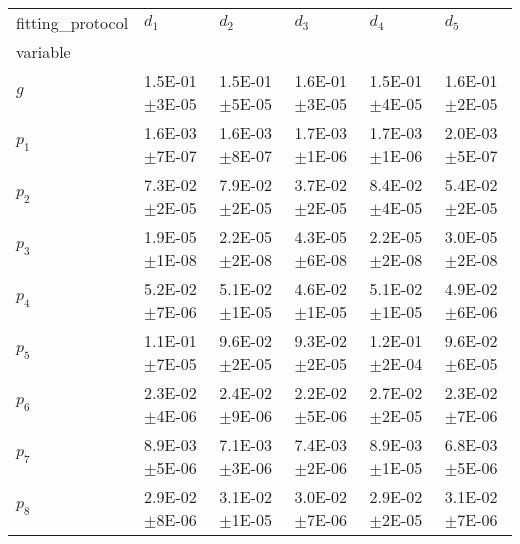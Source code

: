 \begin{tabular}{llllll}
fitting_protocol & $d_1$ & $d_2$ & $d_3$ & $d_4$ & $d_5$ \\
variable &  &  &  &  &  \\
$g$ & 1.5E-01\(\pm\)3E-05 & 1.5E-01\(\pm\)5E-05 & 1.6E-01\(\pm\)3E-05 & 1.5E-01\(\pm\)4E-05 & 1.6E-01\(\pm\)2E-05 \\
$p_1$ & 1.6E-03\(\pm\)7E-07 & 1.6E-03\(\pm\)8E-07 & 1.7E-03\(\pm\)1E-06 & 1.7E-03\(\pm\)1E-06 & 2.0E-03\(\pm\)5E-07 \\
$p_2$ & 7.3E-02\(\pm\)2E-05 & 7.9E-02\(\pm\)2E-05 & 3.7E-02\(\pm\)2E-05 & 8.4E-02\(\pm\)4E-05 & 5.4E-02\(\pm\)2E-05 \\
$p_3$ & 1.9E-05\(\pm\)1E-08 & 2.2E-05\(\pm\)2E-08 & 4.3E-05\(\pm\)6E-08 & 2.2E-05\(\pm\)2E-08 & 3.0E-05\(\pm\)2E-08 \\
$p_4$ & 5.2E-02\(\pm\)7E-06 & 5.1E-02\(\pm\)1E-05 & 4.6E-02\(\pm\)1E-05 & 5.1E-02\(\pm\)1E-05 & 4.9E-02\(\pm\)6E-06 \\
$p_5$ & 1.1E-01\(\pm\)7E-05 & 9.6E-02\(\pm\)2E-05 & 9.3E-02\(\pm\)2E-05 & 1.2E-01\(\pm\)2E-04 & 9.6E-02\(\pm\)6E-05 \\
$p_6$ & 2.3E-02\(\pm\)4E-06 & 2.4E-02\(\pm\)9E-06 & 2.2E-02\(\pm\)5E-06 & 2.7E-02\(\pm\)2E-05 & 2.3E-02\(\pm\)7E-06 \\
$p_7$ & 8.9E-03\(\pm\)5E-06 & 7.1E-03\(\pm\)3E-06 & 7.4E-03\(\pm\)2E-06 & 8.9E-03\(\pm\)1E-05 & 6.8E-03\(\pm\)5E-06 \\
$p_8$ & 2.9E-02\(\pm\)8E-06 & 3.1E-02\(\pm\)1E-05 & 3.0E-02\(\pm\)7E-06 & 2.9E-02\(\pm\)2E-05 & 3.1E-02\(\pm\)7E-06 \\
\end{tabular}
